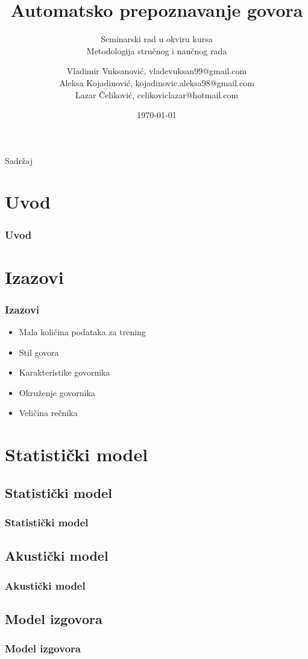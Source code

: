 \documentclass{beamer}
\title{Automatsko prepoznavanje govora}
\subtitle{Seminarski rad u okviru kursa\\Metodologija stručnog i naučnog rada}
\author[Vladimir Vuksanović, Aleksa Kojadinović, Lazar Čeliković]{
    \texorpdfstring{Vladimir Vuksanović, vladevuksan99@gmail.com\\Aleksa Kojadinović, kojadinovic.aleksa98@gmail.com\\Lazar Čeliković, celikoviclazar@hotmail.com}
    {Vladimir Vuksanović, Aleksa Kojadinović, Lazar Čeliković}
}
\institute{Matematički fakultet}
\date{\today}
\begin{document}
\frame{\titlepage}

\begin{frame}{Sadržaj}
    \tableofcontents
\end{frame}

\section{Uvod}
\begin{frame}
    \frametitle{Uvod}
\end{frame}

\section{Izazovi}
\begin{frame}
    \frametitle{Izazovi}

    \begin{itemize}
        \item Mala količina podataka za trening
        \item Stil govora
        \item Karakteristike govornika
        \item Okruženje govornika
        \item Veličina rečnika
    \end{itemize}
\end{frame}

\section{Statistički model}

\subsection{Statistički model}
\begin{frame}
    \frametitle{Statistički model}
\end{frame}

\subsection{Akustički model}
\begin{frame}
    \frametitle{Akustički model}
\end{frame}

\subsection{Model izgovora}
\begin{frame}
    \frametitle{Model izgovora}
\end{frame}
\end{document}
